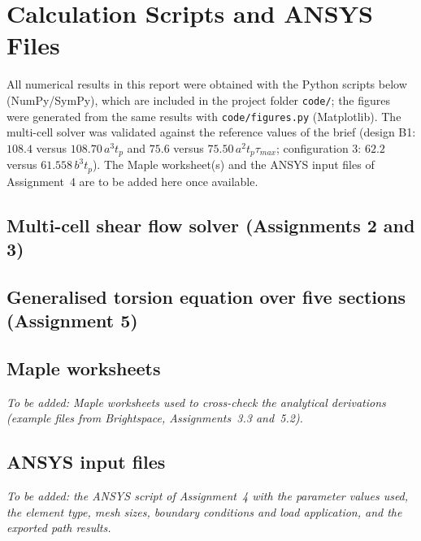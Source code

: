 \chapter{Calculation Scripts and ANSYS Files}
\label{ch:appendix}

All numerical results in this report were obtained with the Python scripts below (NumPy/SymPy), which are included in the project folder \texttt{code/}; the figures were generated from the same results with \texttt{code/figures.py} (Matplotlib). The multi-cell solver was validated against the reference values of the brief (design B1: $108.4$ versus $108.70\,a^3t_p$ and $75.6$ versus $75.50\,a^2t_p\tau_{max}$; configuration 3: $62.2$ versus $61.558\,b^3t_p$). The Maple worksheet(s) and the ANSYS input files of Assignment~4 are to be added here once available.

\section{Multi-cell shear flow solver (Assignments 2 and 3)}

{\footnotesize}

\section{Generalised torsion equation over five sections (Assignment 5)}

{\footnotesize}

\section{Maple worksheets}

\textit{To be added: Maple worksheets used to cross-check the analytical derivations (example files from Brightspace, Assignments~3.3 and~5.2).}

\section{ANSYS input files}

\textit{To be added: the ANSYS script of Assignment~4 with the parameter values used, the element type, mesh sizes, boundary conditions and load application, and the exported path results.}
